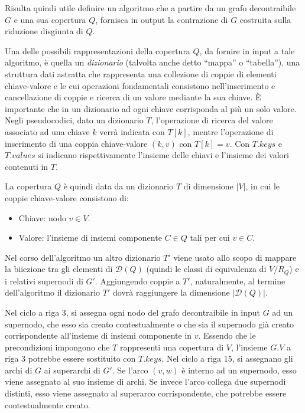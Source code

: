 Risulta quindi utile definire un algoritmo che a partire da un grafo decontraibile $G$ e una sua copertura $Q$,
fornisca in output la contrazione di $G$ costruita sulla riduzione disgiunta di $Q$. \newline

Una delle possibili rappresentazioni della copertura $Q$, da fornire in input a tale algoritmo, è quella un
\textit{dizionario} (talvolta anche detto ``mappa'' o ``tabella''), una struttura dati astratta che rappresenta una
collezione di coppie di elementi chiave-valore e le cui operazioni fondamentali consistono nell'inserimento e
cancellazione di coppie e ricerca di un valore mediante la sua chiave. \`E importante che in un dizionario
ad ogni chiave corrisponda al più un solo valore.
Negli pseudocodici, dato un dizionario $T$, l'operazione di ricerca del valore associato ad una chiave $k$ verrà
indicata con $T[k]$, mentre l'operazione di inserimento di una coppia chiave-valore $(k, v)$ con $T[k] = v$.
Con $T.keys$ e $T.values$ si indicano rispettivamente l'insieme delle chiavi e l'insieme dei valori contenuti in $T$.

La copertura $Q$ è quindi data da un dizionario $T$ di dimensione $|V|$, in cui le coppie chiave-valore consistono di:
\begin{itemize}
    \item Chiave: nodo $v \in V$.
    \item Valore: l'insieme di insiemi componente $C \in Q$ tali per cui $v \in C$.
\end{itemize}
\newpage

Nel corso dell'algoritmo un altro dizionario $T'$ viene usato allo scopo di mappare la biiezione tra gli elementi
di $\mathcal{D}(Q)$ (quindi le classi di equivalenza di $V/R_Q$) e i relativi supernodi di $G'$.
Aggiungendo coppie a $T'$, naturalmente, al termine dell'algoritmo il dizionario $T'$ dovrà raggiungere la dimensione
$|\mathcal{D}(Q)|$.

Nel ciclo a riga 3, si assegna ogni nodo del grafo decontraibile in input $G$ ad un supernodo, che esso sia
creato contestualmente o che sia il supernodo già creato corrispondente all'insieme di insiemi componente in $v$.
Essendo che le precondizioni impongono che $T$ rappresenti una copertura di $V$, l'insieme $G.V$ a riga 3
potrebbe essere sostituito con $T.keys$.
Nel ciclo a riga 15, si assegnano gli archi di $G$ ai superarchi di $G'$. Se l'arco $(v, w)$ è interno ad un
supernodo, esso viene assegnato al suo insieme di archi. Se invece l'arco collega due supernodi distinti, esso
viene assegnato al superarco corrispondente, che potrebbe essere contestualmente creato.

